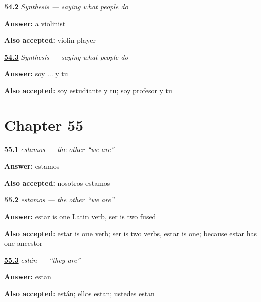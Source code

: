 \noindent\begin{minipage}[t]{\linewidth}
\raggedright
\hyperlink{review-ES-C09-sintesis-trabajo-read}{\textbf{54.2}} \emph{Synthesis — saying what people do}\par
\small \textbf{Answer:} a violinist\par
\footnotesize \textbf{Also accepted:} violin player
\end{minipage}\par\medskip

\noindent\begin{minipage}[t]{\linewidth}
\raggedright
\hyperlink{review-ES-C09-sintesis-trabajo-turn}{\textbf{54.3}} \emph{Synthesis — saying what people do}\par
\small \textbf{Answer:} soy ... y tu\par
\footnotesize \textbf{Also accepted:} soy estudiante y tu; soy profesor y tu
\end{minipage}\par\medskip

\section*{Chapter 55}

\noindent\begin{minipage}[t]{\linewidth}
\raggedright
\hyperlink{review-ES-C09-estamos-form}{\textbf{55.1}} \emph{estamos — the other \textquotedblleft{}we are\textquotedblright{}}\par
\small \textbf{Answer:} estamos\par
\footnotesize \textbf{Also accepted:} nosotros estamos
\end{minipage}\par\medskip

\noindent\begin{minipage}[t]{\linewidth}
\raggedright
\hyperlink{review-ES-C09-estamos-why}{\textbf{55.2}} \emph{estamos — the other \textquotedblleft{}we are\textquotedblright{}}\par
\small \textbf{Answer:} estar is one Latin verb, ser is two fused\par
\footnotesize \textbf{Also accepted:} estar is one verb; ser is two verbs, estar is one; because estar has one ancestor
\end{minipage}\par\medskip

\noindent\begin{minipage}[t]{\linewidth}
\raggedright
\hyperlink{review-ES-C09-estan-form}{\textbf{55.3}} \emph{están — \textquotedblleft{}they are\textquotedblright{}}\par
\small \textbf{Answer:} estan\par
\footnotesize \textbf{Also accepted:} están; ellos estan; ustedes estan
\end{minipage}\par\medskip

